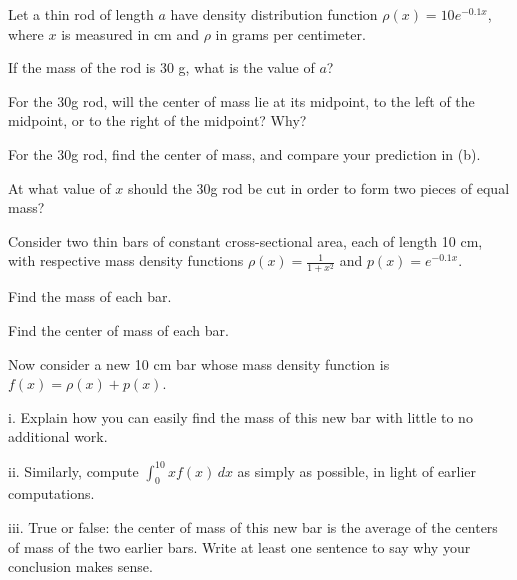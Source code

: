 \begin{exercises} 
  \item Let a thin rod of length $a$ have density distribution function $\rho(x) = 10e^{-0.1x}$, where $x$ is measured in cm and $\rho$ in grams per centimeter.
  \ba
  	\item If the mass of the rod is 30 g, what is the value of $a$?
	\item For the 30g rod, will the center of mass lie at its midpoint, to the left of the midpoint, or to the right of the midpoint?  Why?
	\item For the 30g rod, find the center of mass, and compare your prediction in (b).
	\item At what value of $x$ should the 30g rod be cut in order to form two pieces of equal mass? 
  \ea
  
  \item Consider two thin bars of constant cross-sectional area, each of length 10 cm, with respective mass density functions $\rho(x) = \frac{1}{1+x^2}$ and $p(x) = e^{-0.1x}$.
  \ba
  	\item Find the mass of each bar.
	\item Find the center of mass of each bar.
	\item Now consider a new 10 cm bar whose mass density function is $f(x) = \rho(x) + p(x)$.  
	\be
		\item[i.]  Explain how you can easily find the mass of this new bar with little to no additional work.
		\item[ii.]  Similarly, compute $\int_0^{10} xf(x) \, dx$ as simply as possible, in light of earlier computations.
		\item[iii.]  True or false:  the center of mass of this new bar is the average of the centers of mass of the two earlier bars.  Write at least one sentence to say why your conclusion makes sense.
	\ee
  \ea
  

\end{exercises}
